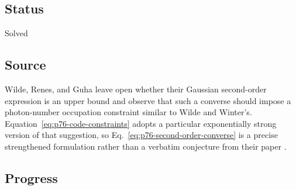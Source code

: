 \subsection*{Status}

Solved

\subsection*{Source}

Wilde, Renes, and Guha leave open whether their Gaussian second-order
expression is an upper bound and observe that such a converse should impose a
photon-number occupation constraint similar to Wilde and Winter's.
Equation~\eqref{eq:p76-code-constraints} adopts a particular exponentially
strong version of that suggestion, so Eq.~\eqref{eq:p76-second-order-converse}
is a precise strengthened formulation rather than a verbatim conjecture from
their paper
.

\subsection*{Progress}

